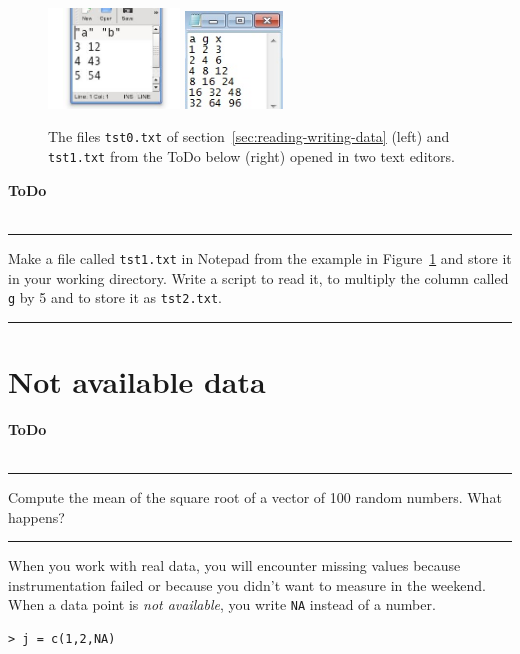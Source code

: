 \documentclass[a4paper,11pt,twocolumn,tablecaptionabove]{scrartcl}
\newenvironment{ToDo} {%
  \begin{flushright}
    \hfill
    \begin{minipage}{0.95\columnwidth}         %
    \textsf{\textbf{ToDo}} \\
      \vspace{-0.85cm}\\
      {\color{Gray}\rule[-0.1cm]{\columnwidth}{1.5pt}}} { %
      {\color{Gray} \rule[0.3cm]{\columnwidth}{1.5pt}}
    \end{minipage}
    \vspace{1em}
  \end{flushright}
  }
\begin{document}
\begin{figure}[h]
  \centering
  \includegraphics[width=3.5cm]{img/tst0.jpeg}
  \includegraphics[width=2.6cm]{img/tst1.jpg}
  \caption{The files \texttt{tst0.txt} of section~\ref{sec:reading-writing-data}
    (left) and \texttt{tst1.txt} from the ToDo below (right) opened in two text editors.}
  \label{fig:tst0}
\end{figure}

\begin{ToDo}
  Make a file called \texttt{tst1.txt} in Notepad from the example in Figure~\ref{fig:tst0} and store it in your working directory. Write a
  script to read it, to multiply the column called \texttt{g} by 5 and to store it as
  \texttt{tst2.txt}.\\
\end{ToDo}


\section{Not available data}

\begin{ToDo}
Compute the mean of the square root of a vector of 100 random numbers. What happens? 
\end{ToDo}

When you work with real data, you will encounter missing values because instrumentation failed or because you didn't want to measure in the weekend. When a data point is \emph{not available}, you write \texttt{NA} instead of a number. 

\begin{Verbatim}[frame=single,gobble=0]
> j = c(1,2,NA)
\end{Verbatim}
\end{document}
